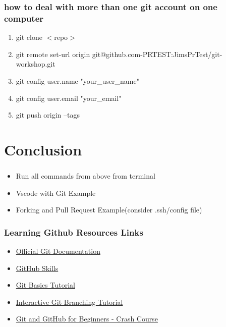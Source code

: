 \documentclass{beamer}
\begin{document}
\begin{frame}\frametitle{how to deal with more than one git account on one computer}
\begin{enumerate}
\item git clone $<$repo$>$
\item git remote set-url origin git@github.com-PRTEST:JimsPrTest/git-workshop.git
\item git config user.name "your\_user\_name"
\item git config user.email "your\_email"
\item git push origin --tags
\end{enumerate}
\end{frame}


\section{Conclusion}
\begin{frame}\frametitle{}
\begin{itemize}
\item Run all commands from above from terminal
\item Vscode with Git Example
\item Forking and Pull Request Example(consider .ssh/config file)
\end{itemize}
\end{frame}


\begin{frame}\frametitle{Learning Github Resources Links}
\begin{itemize}
\item \href{https://git-scm.com/doc}{Official Git Documentation}
\item \href{https://skills.github.com/}{GitHub Skills} 
\item \href{https://www.atlassian.com/git/tutorials}{Git Basics Tutorial} 
\item \href{https://learngitbranching.js.org/}{Interactive Git Branching Tutorial} 
\item \href{https://www.youtube.com/watch?v=RGOj5yH7evk}{Git and GitHub for Beginners - Crash Course}    
\end{itemize}
\end{frame}
\end{document}

